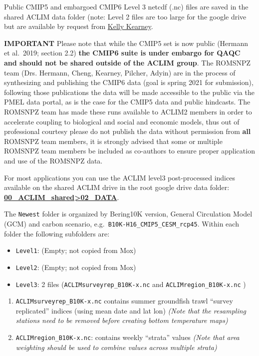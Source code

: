 \documentclass[
]{article}
\providecommand{\tightlist}{%
  \setlength{\itemsep}{0pt}\setlength{\parskip}{0pt}}
\begin{document}
Public CMIP5 and embargoed CMIP6 Level 3 netcdf (.nc) files are saved in
the shared ACLIM data folder (note: Level 2 files are too large for the
google drive but are available by request from
\href{kelly.kearney@noaa.gov}{Kelly Kearney}.

\textbf{IMPORTANT} Please note that while the CMIP5 set is now public
(Hermann et al.~2019; section 2.2) \textbf{the CMIP6 suite is under
embargo for QAQC and should not be shared outside of the ACLIM group}.
The ROMSNPZ team (Drs. Hermann, Cheng, Kearney, Pilcher, Adyin) are in
the process of synthesizing and publishing the CMIP6 data (goal is
spring 2021 for submission), following those publications the data will
be made accessible to the public via the PMEL data portal, as is the
case for the CMIP5 data and public hindcasts. The ROMSNPZ team has made
these runs available to ACLIM2 members in order to accelerate coupling
to biological and social and economic models, thus out of professional
courtesy please do not publish the data without permission from
\textbf{all} ROMSNPZ team members, it is strongly advised that some or
multiple ROMSNPZ team members be included as co-authors to ensure proper
application and use of the ROMSNPZ data.

For most applications you can use the ACLIM level3 post-processed
indices available on the shared ACLIM drive in the root google drive
data folder:
\href{https://drive.google.com/drive/u/0/folders/0Bx7wdZllbuF9eDJndkhCS2EwQUk}{\textbf{00\_ACLIM\_shared\textgreater02\_DATA}}.

The \texttt{Newest} folder is organized by Bering10K version, General
Circulation Model (GCM) and carbon scenario,
e.g.~\texttt{B10K-H16\_CMIP5\_CESM\_rcp45}. Within each folder the
following subfolders are:

\begin{itemize}
\tightlist
\item
  \texttt{Level1}: (Empty; not copied from Mox)
\item
  \texttt{Level2}: (Empty; not copied from Mox)
\item
  \texttt{Level3}: 2 files (\texttt{ACLIMsurveyrep\_B10K-x.nc} and
  \texttt{ACLIMregion\_B10K-x.nc} )
\end{itemize}

\begin{enumerate}
\def\labelenumi{\arabic{enumi})}
\tightlist
\item
  \texttt{ACLIMsurveyrep\_B10K-x.nc} contains summer groundfish trawl
  ``survey replicated'' indices (using mean date and lat lon)
  \emph{(Note that the resampling stations need to be removed before
  creating bottom temperature maps)}\\
\item
  \texttt{ACLIMregion\_B10K-x.nc}: contains weekly ``strata'' values
  \emph{(Note that area weighting should be used to combine values
  across multiple strata)}
\end{enumerate}
\end{document}
